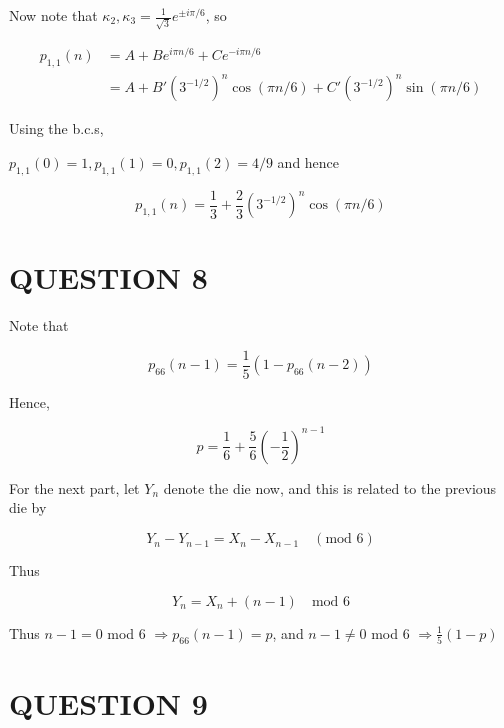\documentclass[a4paper]{article}
\begin{document}
\begin{enumerate}
Now note that $ \kappa_{2},\kappa_{3} = \frac{1}{\sqrt{3}} e^{\pm i \pi / 6}  $, so 

\begin{align*}
 p_{1,1}(n) & = A + B e^{i \pi n / 6} + C e^{- i \pi n / 6}  \\
& = A + B' \left(  3^{-1/2} \right)^{n}  \cos( \pi n / 6) + C' \left(  3^{-1/2} \right)^{n} \sin ( \pi n / 6)
\end{align*}

Using the b.c.s,

$ p_{1,1}(0) = 1, p_{1,1}(1) = 0, p_{1,1}(2) = 4/9 $ and hence

\[ p_{1,1}(n) = \frac{1}{3} + \frac{2}{3} \left(  3^{-1/2} \right)^{n} \cos (\pi n / 6)  \]





\end{enumerate}





\section{QUESTION 8}


Note that

\[ p_{66}(n-1) = \frac{1}{5} (1 - p_{66}(n-2)    ) \]

Hence,

\[ p = \frac{1}{6} + \frac{5}{6}\left(  - \frac{1}{2} \right)^{n-1}   \]


For the next part, let $ Y_{n} $ denote the die now, and this is related to the previous die by

\[ Y_{n} - Y_{n-1} = X_{n} - X_{n-1} \quad (\text{mod } 6)   \]

Thus

\[ Y_{n}  = X_{n} + (n-1) \quad \text{mod } 6  \]

Thus $ n-1 = 0 $ mod 6 $ \Rightarrow  p_{66} (n-1) = p   $, and
$ n -1 \neq 0  $ mod 6 $ \Rightarrow \frac{1}{5} (1-p)  $




\section{QUESTION 9}
\end{document}
